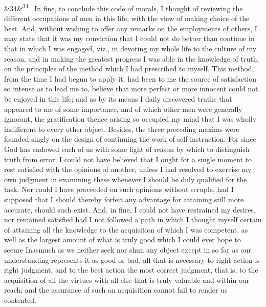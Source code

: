 \documentclass[12pt]{article}
\newcommand{\para}[1][]{\par\noindent\ifx&#1&\else\textsuperscript{\footnotesize #1}~\fi}
\begin{document}
\para[34] In fine, to conclude this code of morals, I thought of reviewing the different occupations of men in this life, with the view of making choice of the best. And, without wishing to offer any remarks on the employments of others, I may state that it was my conviction that I could not do better than continue in that in which I was engaged, viz., in devoting my whole life to the culture of my reason, and in making the greatest progress I was able in the knowledge of truth, on the principles of the method which I had prescribed to myself. This method, from the time I had begun to apply it, had been to me the source of satisfaction so intense as to lead me to, believe that more perfect or more innocent could not be enjoyed in this life; and as by its means I daily discovered truths that appeared to me of some importance, and of which other men were generally ignorant, the gratification thence arising so occupied my mind that I was wholly indifferent to every other object. Besides, the three preceding maxims were founded singly on the design of continuing the work of self-instruction. For since God has endowed each of us with some light of reason by which to distinguish truth from error, I could not have believed that I ought for a single moment to rest satisfied with the opinions of another, unless I had resolved to exercise my own judgment in examining these whenever I should be duly qualified for the task. Nor could I have proceeded on such opinions without scruple, had I supposed that I should thereby forfeit any advantage for attaining still more accurate, should such exist. And, in fine, I could not have restrained my desires, nor remained satisfied had I not followed a path in which I thought myself certain of attaining all the knowledge to the acquisition of which I was competent, as well as the largest amount of what is truly good which I could ever hope to secure Inasmuch as we neither seek nor shun any object except in so far as our understanding represents it as good or bad, all that is necessary to right action is right judgment, and to the best action the most correct judgment, that is, to the acquisition of all the virtues with all else that is truly valuable and within our reach; and the assurance of such an acquisition cannot fail to render us contented.
\end{document}
